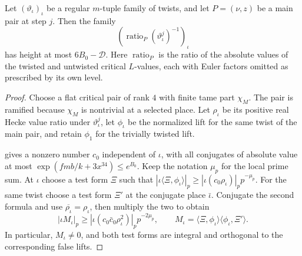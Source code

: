 \begin{lemma}
\label{lem:c-main-pair-height}
\emitthmsource
Let $(\vartheta_\iota)_\iota$ be a regular $m$-tuple family of twists, and let $P=(\nu,z)$ be a main pair at step $j$. Then the family
\[
 \left(\operatorname{ratio}_{P}(\vartheta_\iota^j)^{-1}\right)_\iota
\]
has height at most $6B_0-\mathcal D$. Here $\operatorname{ratio}_{P}$ is the ratio of the absolute values of the twisted and untwisted critical $L$-values, each with Euler factors omitted as prescribed by its own level.
\end{lemma}
\begin{proof}
Choose a flat critical pair of rank $4$ with finite tame part $\chi_M$. The pair is ramified because $\chi_M$ is nontrivial at a selected place. Let $\rho_\iota$ be its positive real Hecke value ratio under $\vartheta_\iota^j$, let $\phi_\iota$ be the normalized lift for the same twist of the main pair, and retain $\phi_1$ for the trivially twisted lift.

 gives a nonzero number $c_0$ independent of $\iota$, with all conjugates of absolute value at most $\exp(fmb/k+3x^{34})\le e^{B_0}$. Keep the notation $\mu_p$ for the local prime sum. At $\iota$ choose a test form $\Xi$ such that $|\iota\langle\Xi,\phi_\iota\rangle|_p\ge |\iota(c_0\rho_\iota)|_p p^{-\mu_p}$. For the same twist choose a test form $\Xi'$ at the conjugate place $\bar\iota$. Conjugate the second formula and use $\overline{\rho_\iota}=\rho_\iota$, then multiply the two to obtain
\[
 |\iota M_\iota|_p\ge
 |\iota(c_0\bar c_0\rho_\iota^2)|_p p^{-2\mu_p},
 \qquad M_\iota=\langle\Xi,\phi_\iota\rangle
                        \langle\phi_\iota,\Xi'\rangle .
\]
In particular, $M_\iota\ne0$, and both test forms are integral and orthogonal to the corresponding false lifts.


\end{proof}
